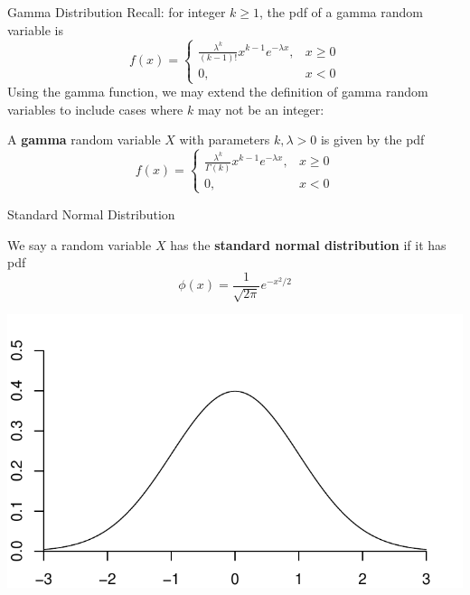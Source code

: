 \documentclass{beamer}
\renewcommand{\emph}{\textbf}
\begin{document}
\begin{frame}{Gamma Distribution}
Recall: for integer $k\geq 1$, the pdf of a gamma random variable is
$$f(x) =\begin{cases} \frac{\lambda^k}{(k-1)!}x^{k-1}e^{-\lambda x}, & x\geq 0 \\ 0, & x<0\end{cases}$$
\pause Using the gamma function, we may extend the definition of gamma random variables to include cases where $k$ may not be an integer:
\begin{block}{}
A \emph{gamma} random variable $X$ with parameters $k,\lambda>0$ is given by the pdf
$$f(x) = \begin{cases}\frac{\lambda^k}{\Gamma(k)}x^{k-1}e^{-\lambda x}, & x\geq 0 \\ 0, & x<0\end{cases}$$
\end{block}
\end{frame}


\begin{frame}{Standard Normal Distribution}
\begin{block}{}
We say a random variable $X$ has the \emph{standard normal distribution} if it has pdf
$$\phi(x)=\frac1{\sqrt{2\pi}}e^{-x^2/2}$$
\end{block}
\begin{center}
\includegraphics[scale=.5]{ch4_pdf_norm.pdf}
\end{center}
\end{frame}
\end{document}
